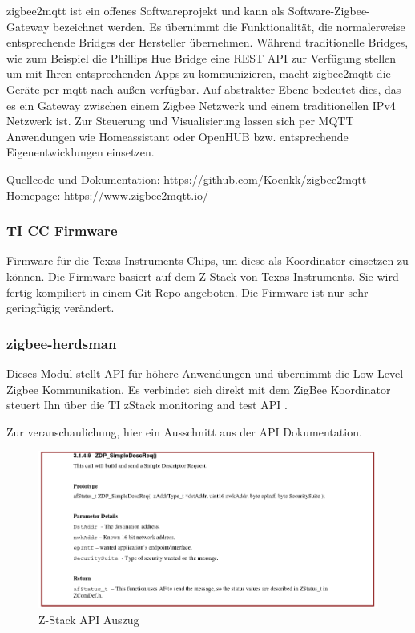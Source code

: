 zigbee2mqtt ist ein offenes Softwareprojekt und kann als \grqq Software-Zigbee-Gateway \grqq bezeichnet werden. Es übernimmt die Funktionalität, die normalerweise entsprechende
\grqq Bridges \grqq der Hersteller übernehmen. Während traditionelle Bridges, wie zum Beispiel die Phillips Hue Bridge eine REST API zur Verfügung stellen um mit Ihren entsprechenden
Apps zu kommunizieren, macht zigbee2mqtt die Geräte per mqtt nach außen verfügbar. Auf abstrakter Ebene bedeutet dies, das es ein Gateway zwischen einem Zigbee Netzwerk und
einem traditionellen IPv4 Netzwerk ist. Zur Steuerung und Visualisierung lassen sich per MQTT Anwendungen wie \grqq Homeassistant \grqq oder \grqq OpenHUB \grqq{} bzw. entsprechende
Eigenentwicklungen einsetzen.

Quellcode und Dokumentation: \url{https://github.com/Koenkk/zigbee2mqtt}
Homepage: \url{https://www.zigbee2mqtt.io/}

\subsubsection{TI CC Firmware}

Firmware für die Texas Instruments Chips, um diese als Koordinator einsetzen zu können. Die Firmware basiert auf dem Z-Stack von Texas Instruments. Sie wird fertig kompiliert
in einem Git-Repo angeboten. Die Firmware ist nur sehr geringfügig verändert. 

\subsubsection{zigbee-herdsman}

Dieses Modul stellt API für höhere Anwendungen und übernimmt die Low-Level Zigbee Kommunikation. Es verbindet sich direkt 
mit dem ZigBee Koordinator steuert Ihn über die \grqq TI zStack monitoring and test API \grqq{}. \cite{zstack}

Zur veranschaulichung, hier ein Ausschnitt aus der API Dokumentation.

\begin{figure}[H]
  \centering
  \includegraphics[width=1\textwidth]{media/z-stack-api-excerpt.png}
  \caption{Z-Stack API Auszug}
\end{figure}

